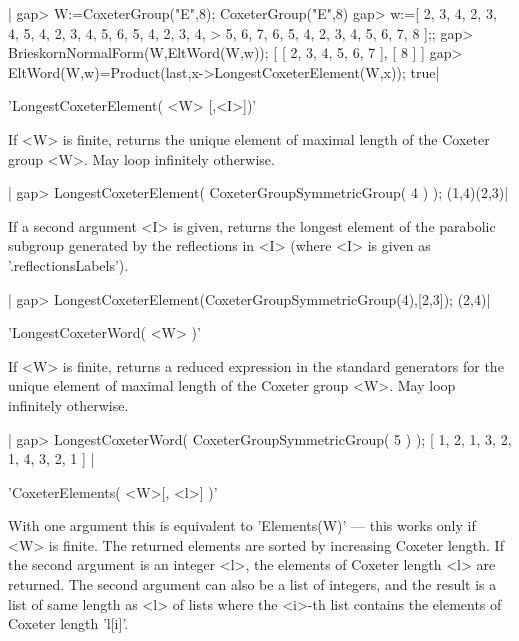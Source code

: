 |    gap> W:=CoxeterGroup("E",8);
    CoxeterGroup("E",8)
    gap> w:=[ 2, 3, 4, 2, 3, 4, 5, 4, 2, 3, 4, 5, 6, 5, 4, 2, 3, 4,
    >   5, 6, 7, 6, 5, 4, 2, 3, 4, 5, 6, 7, 8 ];;
    gap> BrieskornNormalForm(W,EltWord(W,w));
        [ [ 2, 3, 4, 5, 6, 7 ], [ 8 ] ]
    gap> EltWord(W,w)=Product(last,x->LongestCoxeterElement(W,x));
    true|



'LongestCoxeterElement( <W> [,<I>])'

If <W>  is finite, returns the  unique element of maximal  length of the
Coxeter group <W>. May loop infinitely otherwise.

|    gap> LongestCoxeterElement( CoxeterGroupSymmetricGroup( 4 ) );
    (1,4)(2,3)|

If  a second  argument <I>  is given,  returns the  longest element  of the
parabolic  subgroup generated by the reflections in <I> (where <I> is given
as '.reflectionsLabels').

|    gap> LongestCoxeterElement(CoxeterGroupSymmetricGroup(4),[2,3]);
    (2,4)|


'LongestCoxeterWord( <W> )'

If  <W>  is  finite,  returns  a  reduced  expression  in  the  standard
generators for the unique element of maximal length of the Coxeter group
<W>. May loop infinitely otherwise.

|    gap> LongestCoxeterWord( CoxeterGroupSymmetricGroup( 5 ) );
    [ 1, 2, 1, 3, 2, 1, 4, 3, 2, 1 ] |


'CoxeterElements( <W>[, <l>] )'

With  one argument this is equivalent  to 'Elements(W)' --- this works only
if  <W> is finite.  The returned elements  are sorted by increasing Coxeter
length.  If the second argument is an  integer <l>, the elements of Coxeter
length  <l>  are  returned.  The  second  argument  can  also  be a list of
integers, and the result is a list of same length as <l> of lists where the
<i>-th list contains the elements of Coxeter length 'l[i]'.

